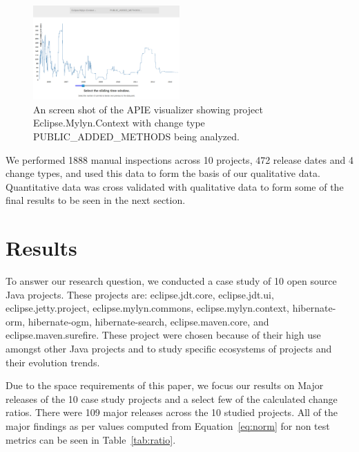 \documentclass[conference]{IEEEtran}
\begin{document}
\begin{figure}[tb!]
\centering
\includegraphics[width=0.5\textwidth]{images/apie.png}
\caption{An screen shot of the APIE visualizer showing project Eclipse.Mylyn.Context with change type PUBLIC\_ADDED\_METHODS being analyzed.\label{fig:apie}}
\end{figure}

We performed 1888 manual inspections across 10 projects, 472 release dates and 4 change types, and used this data to form the basis of our qualitative data.
Quantitative data was cross validated with qualitative data to form some of the final results to be seen in the next section. 

\section{Results}
\label{sec:results}

To answer our research question, we conducted a case study of 10 open source Java projects. These projects are: eclipse.jdt.core, eclipse.jdt.ui, eclipse.jetty.project, 
eclipse.mylyn.commons, eclipse.mylyn.context, hibernate-orm, hibernate-ogm, hibernate-search, eclipse.maven.core, and eclipse.maven.surefire. These project were chosen
because of their high use amongst other Java projects and to study specific ecosystems of projects and their evolution trends.

Due to the space requirements of this paper, we focus our results on Major releases of the 10 case study projects and a select few of the calculated change ratios. 
There were 109 major releases across the 10 studied projects. All of the major findings as per values computed from Equation~\ref{eq:norm} for non test metrics
can be seen in Table~\ref{tab:ratio}.
\end{document}
